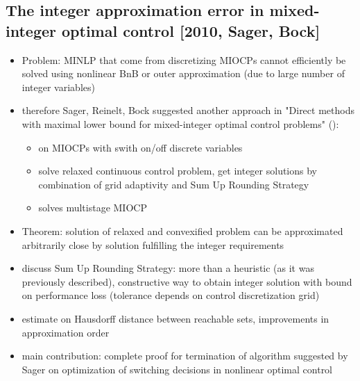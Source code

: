\documentclass{article}
\begin{document}
\subsection{The integer approximation error in mixed-integer optimal control [2010, Sager, Bock]}
\begin{itemize}
\item Problem: MINLP that come from discretizing MIOCPs cannot efficiently be solved using nonlinear BnB or outer approximation (due to large number of integer variables)
\item therefore Sager, Reinelt, Bock suggested another approach in "Direct methods with maximal lower bound for mixed-integer optimal control problems" (\cite{sager2009direct}):
	\begin{itemize}
	\item on MIOCPs with swith on/off discrete variables
	\item solve relaxed continuous control problem, get integer solutions by combination of grid adaptivity and Sum Up Rounding Strategy
	\item solves multistage MIOCP
\end{itemize}	 
\item Theorem: solution of relaxed and convexified problem can be approximated arbitrarily close by solution fulfilling the integer requirements
\item discuss Sum Up Rounding Strategy: more than a heuristic (as it was previously described), constructive way to obtain integer solution with bound on performance loss (tolerance depends on control discretization grid)
\item estimate on Hausdorff distance between reachable sets, improvements in approximation order
\item main contribution: complete proof for termination of algorithm suggested by Sager on optimization of switching decisions in nonlinear optimal control
\end{itemize}
\end{document}

